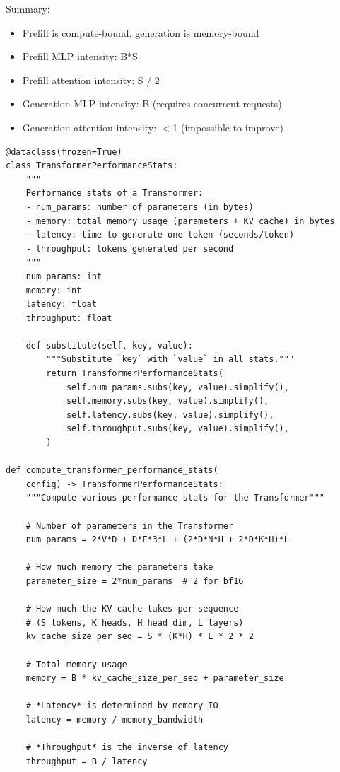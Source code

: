 \documentclass[12pt,twoside]{article}
\begin{document}
Summary:
\begin{itemize}
    \item Prefill is compute-bound, generation is memory-bound
    \item Prefill MLP intensity: B\(*\)S
    \item Prefill attention intensity: S \(/\) 2
    \item Generation MLP intensity: B (requires concurrent requests)
    \item Generation attention intensity: \(<\)1 (impossible to improve)
\end{itemize}

\begin{verbatim}
@dataclass(frozen=True)
class TransformerPerformanceStats:
    """
    Performance stats of a Transformer:
    - num_params: number of parameters (in bytes)
    - memory: total memory usage (parameters + KV cache) in bytes
    - latency: time to generate one token (seconds/token)
    - throughput: tokens generated per second
    """
    num_params: int
    memory: int
    latency: float
    throughput: float
    
    def substitute(self, key, value):
        """Substitute `key` with `value` in all stats."""
        return TransformerPerformanceStats(
            self.num_params.subs(key, value).simplify(),
            self.memory.subs(key, value).simplify(),
            self.latency.subs(key, value).simplify(),
            self.throughput.subs(key, value).simplify(),
        )

def compute_transformer_performance_stats(
    config) -> TransformerPerformanceStats:  
    """Compute various performance stats for the Transformer"""
    
    # Number of parameters in the Transformer
    num_params = 2*V*D + D*F*3*L + (2*D*N*H + 2*D*K*H)*L
    
    # How much memory the parameters take
    parameter_size = 2*num_params  # 2 for bf16
    
    # How much the KV cache takes per sequence 
    # (S tokens, K heads, H head dim, L layers)
    kv_cache_size_per_seq = S * (K*H) * L * 2 * 2 
    
    # Total memory usage
    memory = B * kv_cache_size_per_seq + parameter_size
    
    # *Latency* is determined by memory IO
    latency = memory / memory_bandwidth
    
    # *Throughput* is the inverse of latency
    throughput = B / latency
    

\end{verbatim}
\end{document}
